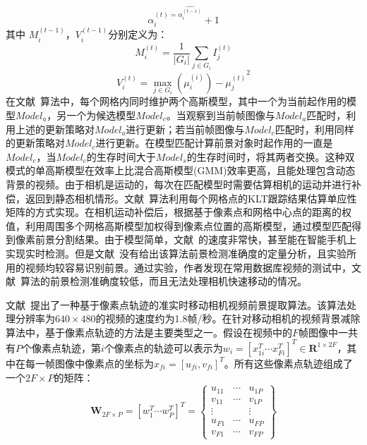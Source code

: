 $$ \alpha_i^{(t) = \hat{\alpha_i^{(t-1)}}}+1$$
其中 $M_i^{(t-1)}$，$V_i^{(t-1)}$分别定义为：
$$ M_i^{(t)} = \frac{1}{|G_i|}\sum_{j\in G_i}I_j^{(t)}$$
$$ V_i^{(t)} = \max_{j \in G_i}{(\mu_i^{(i)})-\mu_j^{(t)}}^2 $$
在文献~算法中，每个网格内同时维护两个高斯模型，其中一个为当前起作用的模型$Model_a$，另一个为候选模型$Model_c$。当观察到当前帧图像与$Model_a$匹配时，利用上述的更新策略对$Model_a$进行更新；若当前帧图像与$Model_c$匹配时，利用同样的更新策略对$Model_c$进行更新。在模型匹配计算前景对象时起作用的一直是$Model_c$，当$Model_c$的生存时间大于$Model_s$的生存时间时，将其两者交换。这种双模式的单高斯模型在效率上比混合高斯模型(GMM)效率更高，且能处理包含动态背景的视频。由于相机是运动的，每次在匹配模型时需要估算相机的运动并进行补偿，返回到静态相机情形。文献~算法利用每个网格点的KLT跟踪结果估算单应性矩阵的方式实现。在相机运动补偿后，根据基于像素点和网格中心点的距离的权值，利用周围多个网格高斯模型加权得到像素点位置的高斯模型，通过模型匹配得到像素前景分割结果。由于模型简单，文献~的速度非常快，甚至能在智能手机上实现实时检测。但是文献~没有给出该算法前景检测准确度的定量分析，且实验所用的视频均较容易识别前景。通过实验，作者发现在常用数据库视频的测试中，文献~算法的前景检测准确度较低，而且无法处理相机快速移动的情况。\par

文献~\cite{ACPRRealTime}提出了一种基于像素点轨迹的准实时移动相机视频前景提取算法。该算法处理分辨率为$640 \times 480$的视频的速度约为1.8帧/秒。在针对移动相机的视频背景减除算法中，基于像素点轨迹的方法是主要类型之一。假设在视频中的$F$帧图像中一共有$P$个像素点轨迹，第$i$个像素点的轨迹可以表示为$w_i={[x_{1i}^T \cdots x_{Fi}^{T}]}^T \in \mathbf{R}^{1 \times 2F}$，其中在每一帧图像中像素点的坐标为$ x_{fi} = {[u_{fi},v_{fi}]}^T$。所有这些像素点轨迹组成了一个$2F \times P$的矩阵：
\begin{equation}
\label{ch5:equ:trajmatrix}
\mathbf{W}_{2F \times P} = {[w_{1}^T \cdots w_{P}^T]}^T = \begin{Bmatrix}
u_{11} & \cdots & u_{1P} \\
v_{11} & \cdots  &  v_{1P}\\
 \vdots &  & \vdots \\
 u_{F1}& \cdots & u_{FP}\\
 v_{F1}& \cdots & v_{FP}
\end{Bmatrix}
\end{equation} \par

